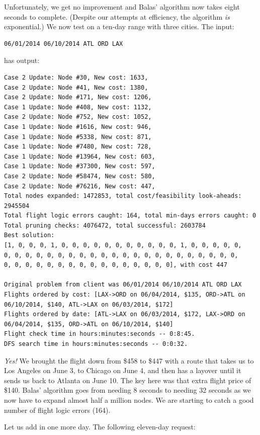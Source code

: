 \documentclass{article}
\begin{document}
Unfortunately, we get no improvement and Balas' algorithm now takes eight seconds to complete. (Despite our attempts at efficiency, the algorithm
\emph{is} exponential.) We now test on a ten-day range with three cities. The input:

\begin{verbatim}
06/01/2014 06/10/2014 ATL ORD LAX
\end{verbatim}

has output:

\scriptsize
\begin{verbatim}
Case 2 Update: Node #30, New cost: 1633, 
Case 2 Update: Node #41, New cost: 1380, 
Case 2 Update: Node #171, New cost: 1206, 
Case 1 Update: Node #408, New cost: 1132, 
Case 2 Update: Node #752, New cost: 1052, 
Case 1 Update: Node #1616, New cost: 946, 
Case 1 Update: Node #5338, New cost: 871, 
Case 1 Update: Node #7480, New cost: 728, 
Case 1 Update: Node #13964, New cost: 603, 
Case 1 Update: Node #37300, New cost: 597, 
Case 2 Update: Node #58474, New cost: 580, 
Case 2 Update: Node #76216, New cost: 447, 
Total nodes expanded: 1472853, total cost/feasibility look-aheads: 2945504
Total flight logic errors caught: 164, total min-days errors caught: 0
Total pruning checks: 4076472, total successful: 2603784
Best solution:
[1, 0, 0, 0, 1, 0, 0, 0, 0, 0, 0, 0, 0, 0, 0, 0, 1, 0, 0, 0, 0, 0,
0, 0, 0, 0, 0, 0, 0, 0, 0, 0, 0, 0, 0, 0, 0, 0, 0, 0, 0, 0, 0, 0,
0, 0, 0, 0, 0, 0, 0, 0, 0, 0, 0, 0, 0, 0, 0, 0], with cost 447

Original problem from client was 06/01/2014 06/10/2014 ATL ORD LAX
Flights ordered by cost: [LAX->ORD on 06/04/2014, $135, ORD->ATL on 06/10/2014, $140, ATL->LAX on 06/03/2014, $172]
Flights ordered by date: [ATL->LAX on 06/03/2014, $172, LAX->ORD on 06/04/2014, $135, ORD->ATL on 06/10/2014, $140]
Flight check time in hours:minutes:seconds -- 0:8:45.
DFS search time in hours:minutes:seconds -- 0:0:32.
\end{verbatim}
\normalsize

\emph{Yes!} We brought the flight down from \$458 to \$447 with a route that takes us to Los Angeles on June 3, to Chicago on June 4, and then has a
layover until it sends us back to Atlanta on June 10. The key here was that extra flight price of \$140. Balas' algorithm goes from needing 8 seconds
to needing 32 seconds as we now have to expand almost half a million nodes. We are starting to catch a good number of flight logic errors (164).

Let us add in one more day. The following eleven-day request:
\end{document}
